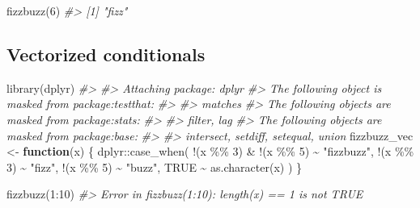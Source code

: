 \documentclass[
]{book}
\newenvironment{Shaded}{\begin{snugshade}}{\end{snugshade}}
\newcommand{\CommentTok}[1]{\textcolor[rgb]{0.56,0.35,0.01}{\textit{#1}}}
\newcommand{\ConstantTok}[1]{\textcolor[rgb]{0.00,0.00,0.00}{#1}}
\newcommand{\ControlFlowTok}[1]{\textcolor[rgb]{0.13,0.29,0.53}{\textbf{#1}}}
\newcommand{\DecValTok}[1]{\textcolor[rgb]{0.00,0.00,0.81}{#1}}
\newcommand{\FunctionTok}[1]{\textcolor[rgb]{0.00,0.00,0.00}{#1}}
\newcommand{\NormalTok}[1]{#1}
\newcommand{\OtherTok}[1]{\textcolor[rgb]{0.56,0.35,0.01}{#1}}
\newcommand{\SpecialCharTok}[1]{\textcolor[rgb]{0.00,0.00,0.00}{#1}}
\newcommand{\StringTok}[1]{\textcolor[rgb]{0.31,0.60,0.02}{#1}}
\begin{document}
\begin{Shaded}
\begin{Highlighting}[]
\FunctionTok{fizzbuzz}\NormalTok{(}\DecValTok{6}\NormalTok{)}
\CommentTok{\#\textgreater{} [1] "fizz"}
\end{Highlighting}
\end{Shaded}

\hypertarget{vectorized-conditionals}{%
\subsection{Vectorized conditionals}\label{vectorized-conditionals}}

\begin{Shaded}
\begin{Highlighting}[]
\FunctionTok{library}\NormalTok{(dplyr)}
\CommentTok{\#\textgreater{} }
\CommentTok{\#\textgreater{} Attaching package: \textquotesingle{}dplyr\textquotesingle{}}
\CommentTok{\#\textgreater{} The following object is masked from \textquotesingle{}package:testthat\textquotesingle{}:}
\CommentTok{\#\textgreater{} }
\CommentTok{\#\textgreater{}     matches}
\CommentTok{\#\textgreater{} The following objects are masked from \textquotesingle{}package:stats\textquotesingle{}:}
\CommentTok{\#\textgreater{} }
\CommentTok{\#\textgreater{}     filter, lag}
\CommentTok{\#\textgreater{} The following objects are masked from \textquotesingle{}package:base\textquotesingle{}:}
\CommentTok{\#\textgreater{} }
\CommentTok{\#\textgreater{}     intersect, setdiff, setequal, union}
\NormalTok{fizzbuzz\_vec }\OtherTok{\textless{}{-}} \ControlFlowTok{function}\NormalTok{(x) \{}
\NormalTok{  dplyr}\SpecialCharTok{::}\FunctionTok{case\_when}\NormalTok{(}
    \SpecialCharTok{!}\NormalTok{(x }\SpecialCharTok{\%\%} \DecValTok{3}\NormalTok{) }\SpecialCharTok{\&} \SpecialCharTok{!}\NormalTok{(x }\SpecialCharTok{\%\%} \DecValTok{5}\NormalTok{) }\SpecialCharTok{\textasciitilde{}} \StringTok{"fizzbuzz"}\NormalTok{,}
    \SpecialCharTok{!}\NormalTok{(x }\SpecialCharTok{\%\%} \DecValTok{3}\NormalTok{) }\SpecialCharTok{\textasciitilde{}} \StringTok{"fizz"}\NormalTok{,}
    \SpecialCharTok{!}\NormalTok{(x }\SpecialCharTok{\%\%} \DecValTok{5}\NormalTok{) }\SpecialCharTok{\textasciitilde{}} \StringTok{"buzz"}\NormalTok{,}
    \ConstantTok{TRUE} \SpecialCharTok{\textasciitilde{}} \FunctionTok{as.character}\NormalTok{(x)}
\NormalTok{  )}
\NormalTok{\}}
\end{Highlighting}
\end{Shaded}

\begin{Shaded}
\begin{Highlighting}[]
\FunctionTok{fizzbuzz}\NormalTok{(}\DecValTok{1}\SpecialCharTok{:}\DecValTok{10}\NormalTok{)}
\CommentTok{\#\textgreater{} Error in fizzbuzz(1:10): length(x) == 1 is not TRUE}
\end{Highlighting}
\end{Shaded}
\end{document}
